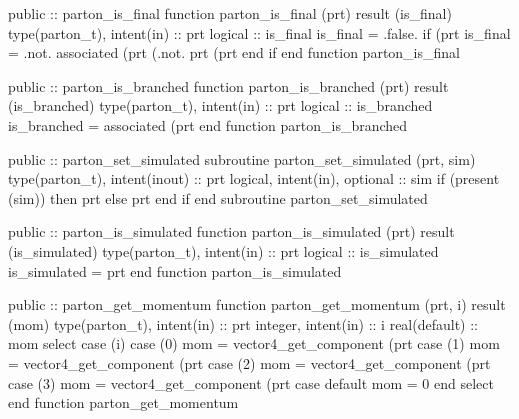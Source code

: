 \eatline
\nwendcode{}\nwdocspar
\nwenddocs{}\plusendmoddef
  public :: parton_is_final
\nwendcode{}\plusendmoddef
  function parton_is_final (prt) result (is_final)
    type(parton_t), intent(in) :: prt
    logical :: is_final
    is_final = .false.
    if (prt%
       is_final = .not. associated (prt%
            (.not. prt%
            (prt%
    end if
  end function parton_is_final

\eatline
\nwendcode{}\nwdocspar
\nwenddocs{}\plusendmoddef
  public :: parton_is_branched
\nwendcode{}\plusendmoddef
  function parton_is_branched (prt) result (is_branched)
    type(parton_t), intent(in) :: prt
    logical :: is_branched
    is_branched = associated (prt%
  end function parton_is_branched

\eatline
\nwendcode{}\nwdocspar
\nwenddocs{}\plusendmoddef
  public :: parton_set_simulated
\nwendcode{}\plusendmoddef
  subroutine parton_set_simulated (prt, sim)
    type(parton_t), intent(inout) :: prt
    logical, intent(in), optional :: sim
    if (present (sim)) then
       prt%
    else
       prt%
    end if
  end subroutine parton_set_simulated

\eatline
\nwendcode{}\nwdocspar
\nwenddocs{}\plusendmoddef
  public :: parton_is_simulated
\nwendcode{}\plusendmoddef
  function parton_is_simulated (prt) result (is_simulated)
    type(parton_t), intent(in) :: prt
    logical :: is_simulated
    is_simulated = prt%
  end function parton_is_simulated

\eatline
\nwendcode{}\nwdocspar
\nwenddocs{}\plusendmoddef
  public :: parton_get_momentum
\nwendcode{}\plusendmoddef
  function parton_get_momentum (prt, i) result (mom)
    type(parton_t), intent(in) :: prt
    integer, intent(in) :: i
    real(default) :: mom
    select case (i)
    case (0)
       mom = vector4_get_component (prt%
    case (1)
       mom = vector4_get_component (prt%
    case (2)
       mom = vector4_get_component (prt%
    case (3)
       mom = vector4_get_component (prt%
    case default
       mom = 0
    end select
  end function parton_get_momentum

